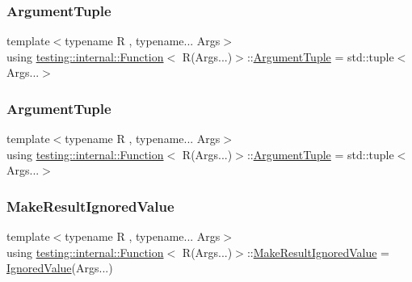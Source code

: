 \subsubsection{\texorpdfstring{ArgumentTuple}{ArgumentTuple}\hspace{0.1cm}{\footnotesize\ttfamily [1/2]}}
{\footnotesize\ttfamily template$<$typename R , typename... Args$>$ \\
using \mbox{\hyperlink{structtesting_1_1internal_1_1_function}{testing\+::internal\+::\+Function}}$<$ R(Args...)$>$\+::\mbox{\hyperlink{structtesting_1_1internal_1_1_function_3_01_r_07_args_8_8_8_08_4_afc6bddfcfc78f9308c268123ebc2a99b}{Argument\+Tuple}} =  std\+::tuple$<$Args...$>$}

\mbox{\label{structtesting_1_1internal_1_1_function_3_01_r_07_args_8_8_8_08_4_afc6bddfcfc78f9308c268123ebc2a99b}} 
\subsubsection{\texorpdfstring{ArgumentTuple}{ArgumentTuple}\hspace{0.1cm}{\footnotesize\ttfamily [2/2]}}
{\footnotesize\ttfamily template$<$typename R , typename... Args$>$ \\
using \mbox{\hyperlink{structtesting_1_1internal_1_1_function}{testing\+::internal\+::\+Function}}$<$ R(Args...)$>$\+::\mbox{\hyperlink{structtesting_1_1internal_1_1_function_3_01_r_07_args_8_8_8_08_4_afc6bddfcfc78f9308c268123ebc2a99b}{Argument\+Tuple}} =  std\+::tuple$<$Args...$>$}

\mbox{\label{structtesting_1_1internal_1_1_function_3_01_r_07_args_8_8_8_08_4_a23361a5e5eb49aad2e1dfe784e60b5da}} 
\subsubsection{\texorpdfstring{MakeResultIgnoredValue}{MakeResultIgnoredValue}\hspace{0.1cm}{\footnotesize\ttfamily [1/2]}}
{\footnotesize\ttfamily template$<$typename R , typename... Args$>$ \\
using \mbox{\hyperlink{structtesting_1_1internal_1_1_function}{testing\+::internal\+::\+Function}}$<$ R(Args...)$>$\+::\mbox{\hyperlink{structtesting_1_1internal_1_1_function_3_01_r_07_args_8_8_8_08_4_a23361a5e5eb49aad2e1dfe784e60b5da}{Make\+Result\+Ignored\+Value}} =  \mbox{\hyperlink{classtesting_1_1internal_1_1_ignored_value}{Ignored\+Value}}(Args...)}

